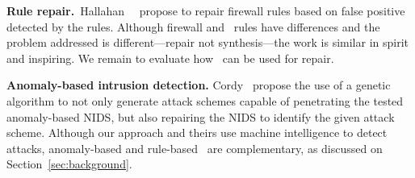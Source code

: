 \documentclass[conference]{IEEEtran}
\begin{document}


\noindent
\textbf{Rule repair.}~Hallahan~\etal{}~\cite{8102263} propose to
repair firewall rules based on false positive detected by the
rules. Although firewall and \nids\ rules have differences and the
problem addressed is different---repair not synthesis---the work is
similar in spirit and inspiring. We remain to evaluate how \tname\ can
be used for repair.

\noindent
\textbf{Anomaly-based intrusion detection.}
Cordy~\etal{}\cite{cordy-etal-issta19} propose the use of a genetic
algorithm to not only generate attack schemes capable of penetrating
the tested anomaly-based NIDS, but also repairing the NIDS to identify
the given attack scheme. Although our approach and theirs use machine
intelligence to detect attacks, anomaly-based and rule-based
\nids\ are complementary, as discussed on
Section~\ref{sec:background}.
\end{document}
